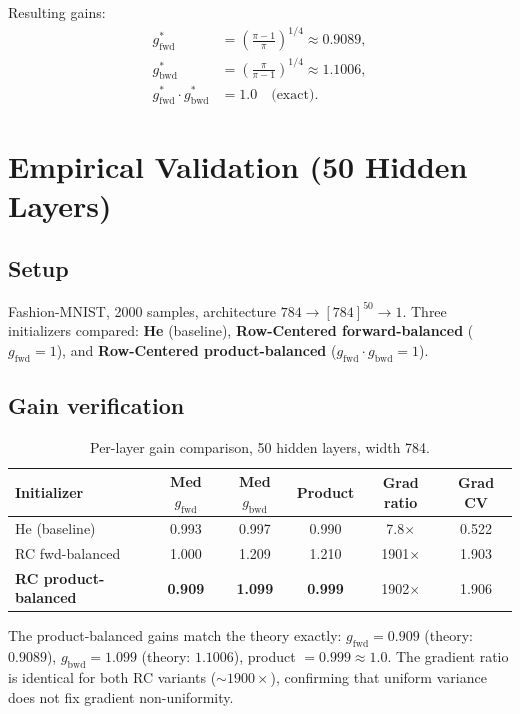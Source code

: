 \documentclass[11pt,a4paper]{article}
\theoremstyle{definition}
\begin{document}
Resulting gains:
\begin{align}
  g_{\mathrm{fwd}}^{\ast} &= \left(\frac{\pi-1}{\pi}\right)^{\!1/4} \approx 0.9089, \label{eq:gfwd-val} \\
  g_{\mathrm{bwd}}^{\ast} &= \left(\frac{\pi}{\pi-1}\right)^{\!1/4} \approx 1.1006, \label{eq:gbwd-val} \\
  g_{\mathrm{fwd}}^{\ast} \cdot g_{\mathrm{bwd}}^{\ast} &= 1.0 \quad\text{(exact)}. \label{eq:product-exact}
\end{align}


\section{Empirical Validation (50 Hidden Layers)}
\label{sec:empirical}

\subsection{Setup}
Fashion-MNIST, 2000 samples, architecture $784 \to [784]^{50} \to 1$.
Three initializers compared: \textbf{He} (baseline), \textbf{Row-Centered
forward-balanced} ($g_{\mathrm{fwd}} = 1$), and \textbf{Row-Centered
product-balanced} ($g_{\mathrm{fwd}} \cdot g_{\mathrm{bwd}} = 1$).

\subsection{Gain verification}

\begin{table}[H]
\centering
\caption{Per-layer gain comparison, 50 hidden layers, width 784.}
\label{tab:gains}
\begin{tabular}{l c c c c c}
\toprule
Initializer & Med $g_{\mathrm{fwd}}$ & Med $g_{\mathrm{bwd}}$ & Product & Grad ratio & Grad CV \\
\midrule
He (baseline)       & 0.993 & 0.997 & 0.990 &    7.8$\times$ & 0.522 \\
RC fwd-balanced     & 1.000 & 1.209 & 1.210 & 1901$\times$   & 1.903 \\
\textbf{RC product-balanced} & \textbf{0.909} & \textbf{1.099} & \textbf{0.999} & 1902$\times$ & 1.906 \\
\bottomrule
\end{tabular}
\end{table}

The product-balanced gains match the theory exactly: $g_{\mathrm{fwd}} = 0.909$
(theory: $0.9089$), $g_{\mathrm{bwd}} = 1.099$ (theory: $1.1006$),
product $= 0.999 \approx 1.0$.  The gradient ratio is identical for both
RC variants ($\sim\!1900\times$), confirming that uniform variance does not fix
gradient non-uniformity.
\end{document}
